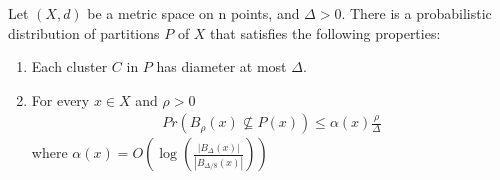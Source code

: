 \begin{theorem} \label{theorem:clustering:2}
Let $(X,d)$ be a metric space on n points, and $\Delta>0$. There is a probabilistic distribution of partitions $P$ of $X$ that satisfies the following properties:
\begin{enumerate}
    \item Each cluster $C$ in $P$ has diameter at most $\Delta$.
    \item For every $x\in X$ and $\rho>0$
    \begin{align*}
        Pr(B_\rho(x)\nsubseteq P(x)) \leq \alpha(x)\frac{\rho}{\Delta}
    \end{align*}
    where $\alpha(x)=O ( \log (\frac{|B_{\Delta}(x)|}{|B_{\Delta/8}(x)|}) ) $
\end{enumerate}

\end{theorem}
